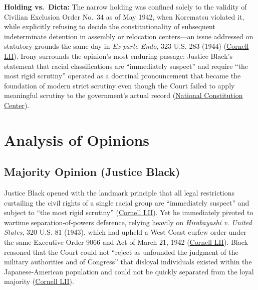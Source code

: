 \documentclass[12pt]{article}
\begin{document}
\textbf{Holding vs.\ Dicta:} The narrow holding was confined solely to the validity of Civilian Exclusion Order No.\ 34 as of May 1942, when Korematsu violated it, while explicitly refusing to decide the constitutionality of subsequent indeterminate detention in assembly or relocation centers---an issue addressed on statutory grounds the same day in \textit{Ex parte Endo}, 323 U.S. 283 (1944) (\href{https://www.law.cornell.edu/supremecourt/text/323/214}{Cornell LII}). Irony surrounds the opinion's most enduring passage: Justice Black's statement that racial classifications are ``immediately suspect'' and require ``the most rigid scrutiny'' operated as a doctrinal pronouncement that became the foundation of modern strict scrutiny even though the Court failed to apply meaningful scrutiny to the government's actual record (\href{https://constitutioncenter.org/blog/on-this-day-the-supreme-court-issues-the-korematsu-decision}{National Constitution Center}).

\section{Analysis of Opinions}

\subsection{Majority Opinion (Justice Black)}
Justice Black opened with the landmark principle that all legal restrictions curtailing the civil rights of a single racial group are ``immediately suspect'' and subject to ``the most rigid scrutiny'' (\href{https://www.law.cornell.edu/supremecourt/text/323/214}{Cornell LII}). Yet he immediately pivoted to wartime separation-of-powers deference, relying heavily on \textit{Hirabayashi v. United States}, 320 U.S. 81 (1943), which had upheld a West Coast curfew order under the same Executive Order 9066 and Act of March 21, 1942 (\href{https://www.law.cornell.edu/supremecourt/text/323/214}{Cornell LII}). Black reasoned that the Court could not ``reject as unfounded the judgment of the military authorities and of Congress'' that disloyal individuals existed within the Japanese-American population and could not be quickly separated from the loyal majority (\href{https://www.law.cornell.edu/supremecourt/text/323/214}{Cornell LII}).
\end{document}
